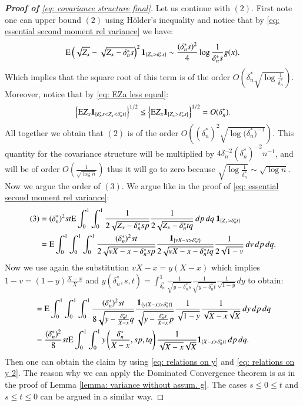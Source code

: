 \begin{proof}[\hypertarget{proof of lemma 1}{\textbf{Proof of}} \eqref{eq: covariance structure final}]
Let us continue with $(2)$. First note one can upper bound $(2)$ using Hölder's inequality and notice that by \eqref{eq: essential second moment rel variance} we have:
\begin{align}\label{eq: symmetric case moment squared}
    \mathrm{E}  \left( \sqrt{Z_x} - \sqrt{Z_x - \delta^*_n s}\right)^2 \mathbf{1}_{\{ Z_x > \delta^*_n s \}} \sim \frac{(\delta^*_n s)^2}{4} \log{\frac{1}{\delta^*_n s}} g(x).
\end{align}
Which implies that the square root of this term is of the order $O(\delta^*_n \sqrt{\log{\frac{1}{\delta^*_n}}})$. Moreover, notice that by \eqref{eq: EZa less equal}:
\begin{align*}
    \left\{ \mathrm{E}  Z_x \mathbf{1}_{\{ \delta^*_n s < Z_x < \delta^*_n t \}} \right\}^{1/2} \leq \left\{ \mathrm{E}  Z_x \mathbf{1}_{\{  Z_x > \delta^*_n s \}} \right\}^{1/2} = O(\delta^*_n ).
\end{align*}
All together we obtain that $(2)$ is of the order $O((\delta^*_n)^2 \sqrt{\log{(\delta^*_n})^{-1}})$. This quantity for the covariance structure will be multiplied by $4 \delta_n^{-2} ( \delta^*_n)^{-2}  n^{-1}$, and will be of order $O(\frac{1}{\sqrt{\log{n}}})$ thus it will go to zero because $\sqrt{\log{\frac{1}{\delta^*_n}}} \sim \sqrt{\log{n}}$. \\
Now we argue the order of $(3)$. We argue like in the proof of \eqref{eq: essential second moment rel variance}:
\begin{align*}
    (3) &= (\delta^*_n)^2 st \mathrm{E}  \int_{0}^{1} \int_{0}^{1} \frac{1}{2 \sqrt{Z_x - \delta^*_n s p}} \frac{1}{2 \sqrt{Z_x - \delta^*_n t q}} \, dp \,dq \: \mathbf{1}_{\{Z_x > \delta^*_n t\}} \\
    &=  \mathrm{E}  \int_{0}^{1} \int_{0}^{1} \int_{0}^{1} \frac{(\delta^*_n)^2 st}{2 \sqrt{vX-x - \delta^*_n s p}} \frac{\mathbf{1}_{\{vX - x > \delta^*_n t\}}}{2 \sqrt{v X - x - \delta^*_n t q}} \frac{1}{2 \sqrt{1-v}} \, dv \, dp \, dq.
\end{align*}
Now we use again the substitution $vX - x = y(X-x)$ which implies $1-v = (1-y) \frac{X-x}{X}$ and $y(\delta^*_n,s,t) = \int_{\delta^*_n}^{1} \frac{1}{\sqrt{y - \delta^*_n s}} \frac{1}{\sqrt{y - \delta^*_n t}} \frac{1}{\sqrt{1-y}} dy$ to obtain:
\begin{align*}
    &=\mathrm{E}  \int_{0}^{1} \int_{0}^{1} \int_{0}^{1} \frac{(\delta^*_n)^2 st}{8 \sqrt{y - \frac{\delta^*_n t}{X-x} q}} \frac{\mathbf{1}_{\{y(X - x) > \delta^*_n t\}}}{ \sqrt{y - \frac{\delta^*_n s}{X-x} p}} \frac{1}{ \sqrt{1-y}} \frac{1}{\sqrt{X-x} \sqrt{X}} \, dy \, dp \, dq \\
    &= \frac{(\delta^*_n)^2}{8} st \mathrm{E}  \int_{0}^{1} \int_{0}^{1} y\left( \frac{\delta^*_n}{X-x},sp,tq \right) \frac{1}{\sqrt{X-x} \sqrt{X}} \mathbf{1}_{\{X - x > \delta^*_n t \}} \, dp \, dq.
\end{align*}
Then one can obtain the claim by using \eqref{eq: relations on y} and \eqref{eq: relations on y 2}. The reason why we can apply the Dominated Convergence theorem is as in the proof of Lemma \ref{lemma: variance without assum. g}. The cases $s \leq 0 \leq t$ and $s \leq t \leq 0$ can be argued in a similar way.
\end{proof}
